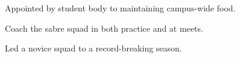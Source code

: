 \documentclass[letterpaper]{deedy-resume} %
\begin{document}
\begin{minipage}[t]{0.39\textwidth}
\indent 

\begin{tightitemize}
	\item Appointed by student body to maintaining campus-wide food.
\end{tightitemize}

\sectionspace 



\begin{tightitemize}
	\item Coach the sabre squad in both practice and at meets.
	\item Led a novice squad to a record-breaking season.
\end{tightitemize}

\sectionspace






\end{minipage} %
\hfill
%
%
\end{document}
